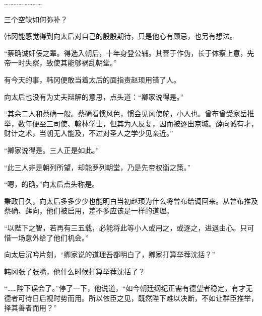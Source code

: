……………………

三个空缺如何弥补？

韩冈能感觉得到向太后对自己的殷殷期待，只是他心有顾忌，也另有想法。

“蔡确诚奸佞之辈。得选入朝后，十年身登公辅。其善于作伪，长于体察上意，先帝一时失察，致使其能够祸乱朝堂。”

有今天的事，韩冈便敢当着太后的面指责赵顼用错了人。

向太后也没有为丈夫辩解的意思，点头道：“卿家说得是。”

“其余二人和蔡确一般。蔡确看惯风色，惯会见风使舵，小人也。曾布曾受家岳推举，数年便至三司使、翰林学士，但其为人反复，因而被逐出京城。薛向诚有才，财计之术，当朝无人能及，不过对圣人之学少见亲近。”

“卿家说得是。三人正是如此。”

“此三人非是朝列所望，却能罗列朝堂，乃是先帝权衡之策。”

“嗯，的确。”向太后点头称是。

秉政日久，向太后多多少少也能明白当初赵顼为什么将曾布给调回来。从曾布推及蔡确、薛向，他们被启用，差不多应该是一样的道理。

“以陛下之智，若再有三五载，必能将此等小人或用之，或逐之，进退由心。只可惜一场意外给了他们机会。”

向太后沉吟片刻，“卿家说的道理吾都明白了，卿家打算举荐沈括？”

韩冈张了张嘴，他什么时候打算举荐沈括了？

“……陛下误会了。”停了一下，他说道，“如今朝廷纲纪正需有德望者稳定，有才无德者可待日后视时势而用。所以依臣之见，既然陛下难以决断，不如让群臣推举，择其善者而用？”

